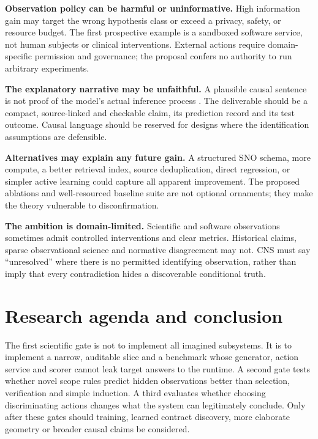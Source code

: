 \documentclass[11pt,a4paper]{article}
\begin{document}
\textbf{Observation policy can be harmful or uninformative.} High
information gain may target the wrong hypothesis class or exceed a
privacy, safety, or resource budget. The first prospective example is a
sandboxed software service, not human subjects or clinical
interventions. External actions require domain-specific permission and
governance; the proposal confers no authority to run arbitrary
experiments.

\textbf{The explanatory narrative may be unfaithful.} A plausible causal
sentence is not proof of the model's actual inference process
\citep{R18}. The deliverable should be a compact, source-linked and
checkable claim, its prediction record and its test outcome. Causal
language should be reserved for designs where the identification
assumptions are defensible.

\textbf{Alternatives may explain any future gain.} A structured SNO
schema, more compute, a better retrieval index, source deduplication,
direct regression, or simpler active learning could capture all apparent
improvement. The proposed ablations and well-resourced baseline suite
are not optional ornaments; they make the theory vulnerable to
disconfirmation.

\textbf{The ambition is domain-limited.} Scientific and software
observations sometimes admit controlled interventions and clear metrics.
Historical claims, sparse observational science and normative
disagreement may not. CNS must say ``unresolved'' where there is no
permitted identifying observation, rather than imply that every
contradiction hides a discoverable conditional truth.

\section{Research agenda and
conclusion}\label{research-agenda-and-conclusion}

The first scientific gate is not to implement all imagined subsystems.
It is to implement a narrow, auditable slice and a benchmark whose
generator, action service and scorer cannot leak target answers to the
runtime. A second gate tests whether novel scope rules predict hidden
observations better than selection, verification and simple induction. A
third evaluates whether choosing discriminating actions changes what the
system can legitimately conclude. Only after these gates should
training, learned contract discovery, more elaborate geometry or broader
causal claims be considered.
\end{document}
